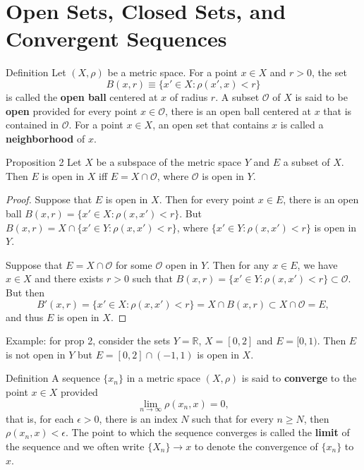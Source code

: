 \section{Open Sets, Closed Sets, and Convergent Sequences}
\begin{namedthm*}{Definition}
    Let $(X,\rho)$ be a metric space. For a point $x\in X$ and $r>0$, the set 
    \[
        B(x,r)\equiv\{x'\in X:\rho(x',x)<r\}
    \]
    is called the \textbf{open ball} centered at $x$ of radius $r$.
    A subset $\mathcal{O}$ of $X$ is said to be \textbf{open} provided for every point $x\in\mathcal{O}$, there is an open ball centered at $x$ that is contained in $\mathcal{O}$.
    For a point $x\in X$, an open set that contains $x$ is called a \textbf{neighborhood} of $x$.
\end{namedthm*}

\begin{namedthm*}{Proposition 2}
    Let $X$ be a subspace of the metric space $Y$ and $E$ a subset of $X$.
    Then $E$ is open in $X$ iff $E=X\cap\mathcal{O}$, where $\mathcal{O}$ is open in $Y$.
\end{namedthm*}
\begin{proof}
    Suppose that $E$ is open in $X$.
    Then for every point $x\in E$, there is an open ball $B(x,r)=\{x'\in X:\rho(x,x')<r\}$.
    But $B(x,r)=X\cap\{x'\in Y:\rho(x,x')<r\}$, where $\{x'\in Y:\rho(x,x')<r\}$ is open in $Y$.

    Suppose that $E=X\cap\mathcal{O}$ for some $\mathcal{O}$ open in $Y$.
    Then for any $x\in E$, we have $x\in X$ and there exists $r>0$ such that $B(x,r)=\{x'\in Y:\rho(x,x')<r\}\subset\mathcal{O}$.
    But then 
    \[
        B'(x,r)=\{x'\in X:\rho(x,x')<r\}=X\cap B(x,r)\subset X\cap\mathcal{O}=E,
    \] 
    and thus $E$ is open in $X$.
\end{proof}
Example: for prop 2, consider the sets $Y=\mathbb{R}$, $X=[0,2]$ and $E=[0,1)$.
Then $E$ is not open in $Y$ but $E=[0,2]\cap(-1,1)$ is open in $X$.

\begin{namedthm*}{Definition}
    A sequence $\{x_n\}$ in a metric space $(X,\rho)$ is said to \textbf{converge} to the point $x\in X$ provided
    \[
        \lim_{n\to\infty}\rho(x_n,x)=0,
    \]
    that is, for each $\epsilon>0$, there is an index $N$ such that for every $n\ge N$, then $\rho(x_n,x)<\epsilon$.
    The point to which the sequence converges is called the \textbf{limit} of the sequence and we often write $\{X_n\}\to x$ to denote the convergence of $\{x_n\}$ to $x$.
\end{namedthm*}

